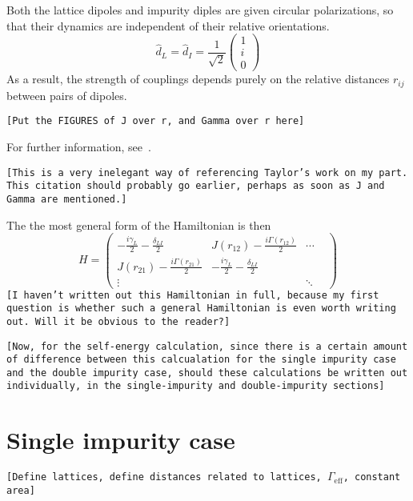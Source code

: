 \documentclass[aps,pra,superscriptaddress,twocolumn]{revtex4-1}
\newcommand{\commentSB}[1]{\texttt{\color{blue}[#1]}}
\newcommand{\commentSO}[1]{\texttt{\color{orange}[#1]}}
\begin{document}
    Both the lattice dipoles and impurity diples are given circular polarizations, so that their dynamics are independent of their relative orientations.
    \begin{equation} 
        \hat{d}_L = \hat{d}_I = \frac{1}{\sqrt{2}} \begin{pmatrix}
        1 \\ i \\ 0
        \end{pmatrix} 
        \label{eqn:polarization}
    \end{equation}
    As a result, the strength of couplings depends purely on the relative distances $r_{ij}$ between pairs of dipoles. 

    \commentSB{Put the FIGURES of J over r, and Gamma over r here}

    For further information, see~\cite{patti_controlling_2021}.

    \commentSB{This is a very inelegant way of referencing Taylor's work on my part. This citation should probably go earlier, perhaps as soon as J and Gamma are mentioned.}

    The the most general form of the Hamiltonian is then
    \begin{equation}
        H = 
        \begin{pmatrix}
            -\frac{i \gamma_L}{2} - \frac{\delta_{LI}}{2} & J(r_{12}) - \frac{i \Gamma(r_{12})}{2} & \cdots \\
            J(r_{21}) - \frac{i \Gamma(r_{21})}{2} & -\frac{i \gamma_L}{2} - \frac{\delta_{LI}}{2} & & \\
            \vdots & & \ddots

        \end{pmatrix}
    \end{equation}
    \commentSB{I haven't written out this Hamiltonian in full, because my first question is whether such a general Hamiltonian is even worth writing out. Will it be obvious to the reader?}

    \commentSB{Now, for the self-energy calculation, since there is a certain amount of difference between this calcualation for the single impurity case and the double impurity case, should these calculations be written out individually, in the single-impurity and double-impurity sections}



\section{Single impurity case}
\commentSO{Define lattices, define distances related to lattices, $\Gamma_\mathrm{eff}$, constant area}
\end{document}
